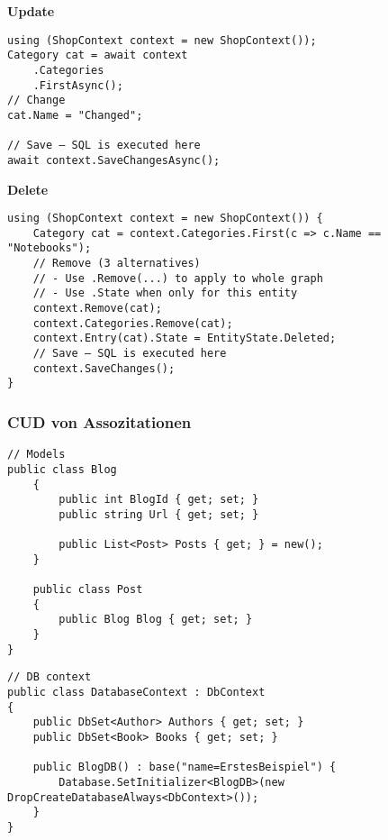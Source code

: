 \textbf{Update}
\begin{lstlisting}
using (ShopContext context = new ShopContext()); 
Category cat = await context
	.Categories 
	.FirstAsync();
// Change 
cat.Name = "Changed";

// Save – SQL is executed here 
await context.SaveChangesAsync();
\end{lstlisting}

\textbf{Delete}
\begin{lstlisting}
using (ShopContext context = new ShopContext()) {
    Category cat = context.Categories.First(c => c.Name == "Notebooks");
    // Remove (3 alternatives)
    // - Use .Remove(...) to apply to whole graph
    // - Use .State when only for this entity
    context.Remove(cat);
    context.Categories.Remove(cat);
    context.Entry(cat).State = EntityState.Deleted;
    // Save – SQL is executed here
    context.SaveChanges();              
}
\end{lstlisting}

\subsubsection{CUD von Assozitationen}







\begin{lstlisting}
// Models
public class Blog
    {
        public int BlogId { get; set; }
        public string Url { get; set; }

        public List<Post> Posts { get; } = new();
    }

    public class Post
    {
        public Blog Blog { get; set; }
    }
}
\end{lstlisting}

\begin{lstlisting}
// DB context
public class DatabaseContext : DbContext
{
    public DbSet<Author> Authors { get; set; }
    public DbSet<Book> Books { get; set; }

	public BlogDB() : base("name=ErstesBeispiel") {
		Database.SetInitializer<BlogDB>(new DropCreateDatabaseAlways<DbContext>());
	}
}	
\end{lstlisting}

